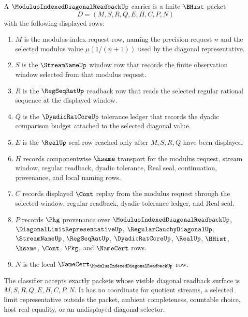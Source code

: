\begin{definition}
\label{def:regular-cauchy-diagonal-selector-carrier}
A $\ModulusIndexedDiagonalReadbackUp$ carrier is a finite $\BHist$ packet
$$
D=(M,S,R,Q,E,H,C,P,N)
$$
with the following displayed rows:
\begin{enumerate}
\item $M$ is the modulus-index request row, naming the precision request $n$ and the selected modulus value $\mu(1/(n+1))$ used by the diagonal representative.
\item $S$ is the $\StreamNameUp$ window row that records the finite observation window selected from that modulus request.
\item $R$ is the $\RegSeqRatUp$ readback row that reads the selected regular rational sequence at the displayed window.
\item $Q$ is the $\DyadicRatCoreUp$ tolerance ledger that records the dyadic comparison budget attached to the selected diagonal value.
\item $E$ is the $\RealUp$ seal row reached only after $M,S,R,Q$ have been displayed.
\item $H$ records componentwise $\hsame$ transport for the modulus request, stream window, regular readback, dyadic tolerance, Real seal, continuation, provenance, and local naming rows.
\item $C$ records displayed $\Cont$ replay from the modulus request through the selected window, regular readback, dyadic tolerance ledger, and Real seal.
\item $P$ records $\Pkg$ provenance over $\ModulusIndexedDiagonalReadbackUp$, $\DiagonalLimitRepresentativeUp$, $\RegularCauchyDiagonalUp$, $\StreamNameUp$, $\RegSeqRatUp$, $\DyadicRatCoreUp$, $\RealUp$, $\BHist$, $\hsame$, $\Cont$, $\Pkg$, and $\NameCert$ rows.
\item $N$ is the local $\NameCert_{\ModulusIndexedDiagonalReadbackUp}$ row.
\end{enumerate}
The classifier accepts exactly packets whose visible diagonal readback surface is $M,S,R,Q,E,H,C,P,N$. It has no coordinate for quotient streams, a selected limit representative outside the packet, ambient completeness, countable choice, host real equality, or an undisplayed diagonal selector.
\end{definition}

